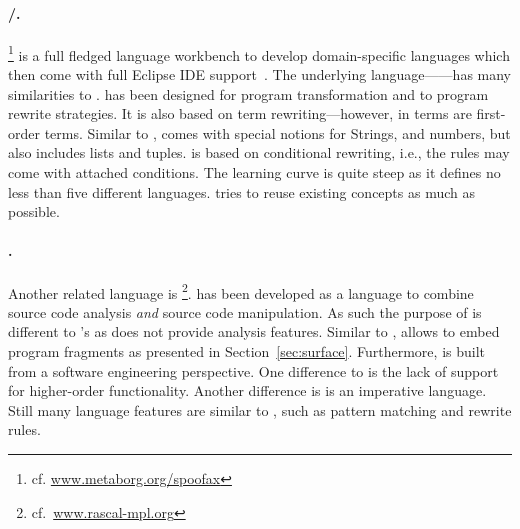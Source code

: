 \paragraph{\Spoofax/\Stratego.} %
%
\Spoofax \footnote{cf.
  \href{www.metaborg.org/spoofax}{www.metaborg.org/spoofax}} is a
full fledged language workbench to develop domain-specific languages 
which then
come with full Eclipse IDE support~\cite{2010_kats_et_al}. The
underlying language---\Stratego \cite{2008_bravenboer_et_al}---has
many similarities to \TransScript. \Stratego has been designed for
program transformation and to program rewrite strategies. It is also
based on term rewriting---however, in \Stratego terms are first-order
terms. Similar to \TransScript, \Stratego comes with special notions
for Strings, and numbers, but also includes lists and
tuples. \Stratego is based on conditional rewriting, i.e., the rules
may come with attached conditions. The \Spoofax learning curve is quite
steep as it defines no less than five different languages. \TransScript 
tries to reuse existing concepts as much as possible.



\paragraph{\Rascal.} %
%
Another related language is \Rascal
\footnote{cf.~\href{http://www.rascal-mpl.org/}{www.rascal-mpl.org}}. \Rascal
\cite{2009_klint_et_al} has been developed as a language to combine
source code analysis \emph{and} source code manipulation. As such the
purpose of \Rascal is different to \TransScript's as \TransScript does
not provide analysis features. Similar to \TransScript, \Rascal allows
to embed program fragments as presented in
Section~\ref{sec:surface}. 
Furthermore, \Rascal is built from a software engineering perspective.
One difference to \TransScript is the lack of support for higher-order
functionality. 
Another difference is \Rascal is an imperative language.
Still many language features are similar to \TransScript, such as pattern matching and
rewrite rules. 

